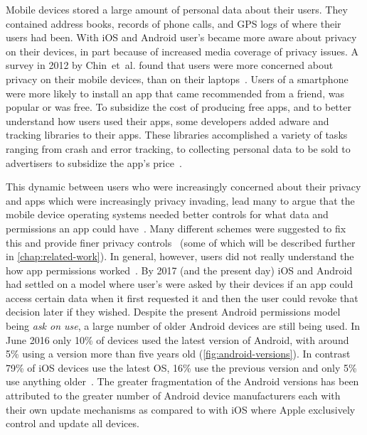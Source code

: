 \documentclass[thesis.tex]{subfiles}
\begin{document}
Mobile devices stored a large amount of personal data about their
users.  They contained address books, records of phone calls, and GPS
logs of where their users had been.  With iOS and Android user's
became more aware about privacy on their devices, in part because of
increased media coverage of privacy issues.  A survey in 2012 by
Chin~et~al{.} found that users were more concerned about privacy on
their mobile devices, than on their
laptops~\cite{chin_measuring_2012}. Users of a smartphone were more
likely to install an app that came recommended from a friend, was
popular or was free.  To subsidize the cost of producing free apps,
and to better understand how users used their apps, some developers
added adware and tracking libraries to their apps.  These libraries
accomplished a variety of tasks ranging from crash and error tracking,
to collecting personal data to be sold to advertisers to subsidize the
app's price~\cite{seungyeop_han_study_2012}.

This dynamic between users who were increasingly concerned about their
privacy and apps which were increasingly privacy invading, lead many
to argue that the mobile device operating systems needed better
controls for what data and permissions an app could
have~\cite{leontiadis_dont_2012}.  Many different schemes were
suggested to fix this and provide finer privacy
controls~\cite{jeon_dr._2012,beresford_mockdroid:_2011,conti_crepe:_2010,backes_appguard_2013}
(some of which will be described further in
\autoref{chap:related-work}).  In general, however, users did not
really understand the how app permissions
worked~\cite{felt_android_2012}.  By 2017 (and the present day) iOS
and Android had settled on a model where user's were asked by their
devices if an app could access certain data when it first requested it
and then the user could revoke that decision later if they wished.
Despite the present Android permissions model being \emph{ask on use},
a large number of older Android devices are still being used.  In June
2016 only 10\% of devices used the latest version of Android, with
around 5\% using a version more than five years old
(\autoref{fig:android-versions}).  In contrast 79\% of iOS devices use
the latest OS, 16\% use the previous version and only 5\% use anything
older~\cite{apple_app_2017}.  The greater fragmentation of the Android
versions has been attributed to the greater number of Android device
manufacturers each with their own update mechanisms as compared to
with iOS where Apple exclusively control and update all devices.
\end{document}
